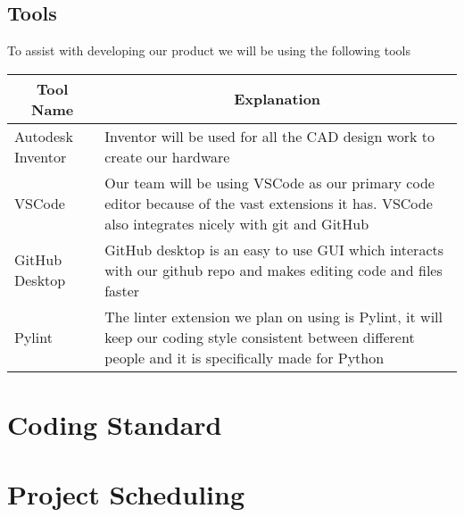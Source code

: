 \documentclass{article}
\begin{document}
\subsection{Tools}
To assist with developing our product we will be using the following tools

\begin{table}[!hbt]
	\centering
	\begin{tabular}{|p{4cm}|p{8cm}|}
	\hline
	\multicolumn{1}{|c|}{\textbf{Tool Name}} & \multicolumn{1}{c|}{\textbf{Explanation}} 
	\\ \hline
	Autodesk Inventor
	&  Inventor will be used for all the CAD design work to create our hardware  
	\newline                              
	\\ \hline
	VSCode
	&  Our team will be using VSCode as our primary code editor because of the vast extensions it has. VSCode also integrates nicely with git and GitHub
	\newline                              
	\\ \hline
	GitHub Desktop
	&  GitHub desktop is an easy to use GUI which interacts with our github repo and makes editing code and files faster
	\newline                              
	\\ \hline
	Pylint
	&  The linter extension we plan on using is Pylint, it will keep our coding style consistent between different people and it is specifically made for Python
	\newline                              
	\\ \hline
	\end{tabular}
\end{table}




\section{Coding Standard}

\section{Project Scheduling}

\end{document}
